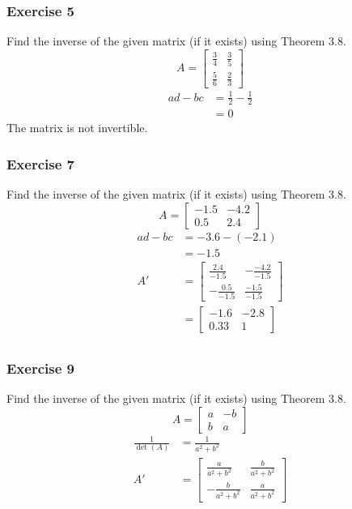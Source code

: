 \documentclass[letterpaper, 12pt]{math}
\begin{document}
\subsubsection*{Exercise 5}
Find the inverse of the given matrix (if it exists) using Theorem 3.8.
\[ A = \begin{bmatrix}\frac{3}{4} & \frac{3}{5} \\[0.25em]
  \frac{5}{6} & \frac{2}{3}\end{bmatrix} \]
\begin{align*}
  ad-bc &= \frac{1}{2}-\frac{1}{2} \\
  &= 0
\end{align*}
The matrix is not invertible.

\subsubsection*{Exercise 7}
Find the inverse of the given matrix (if it exists) using Theorem 3.8.
\[ A = \begin{bmatrix}-1.5 & -4.2 \\[0.25em] 0.5 & 2.4\end{bmatrix} \]
\begin{align*}
  ad-bc &= -3.6-(-2.1) \\
  &= -1.5 \\
  A' &= \begin{bmatrix}
    \frac{2.4}{-1.5} & -\frac{-4.2}{-1.5} \\[0.25em]
    -\frac{0.5}{-1.5} & \frac{-1.5}{-1.5}
  \end{bmatrix} \\
  &= \begin{bmatrix}
    -1.6 & -2.8 \\
    0.33 & 1
  \end{bmatrix} \\
\end{align*}

\subsubsection*{Exercise 9}
Find the inverse of the given matrix (if it exists) using Theorem 3.8.
\[ A = \begin{bmatrix}a & -b \\ b & a\end{bmatrix} \]
\begin{align*}
  \frac{1}{\det(A)} &= \frac{1}{a^2+b^2} \\
  A' &= \begin{bmatrix}
    \frac{a}{a^2+b^2} & \frac{b}{a^2+b^2} \\[0.25em]
    -\frac{b}{a^2+b^2} & \frac{a}{a^2+b^2}
  \end{bmatrix}
\end{align*}
\end{document}
